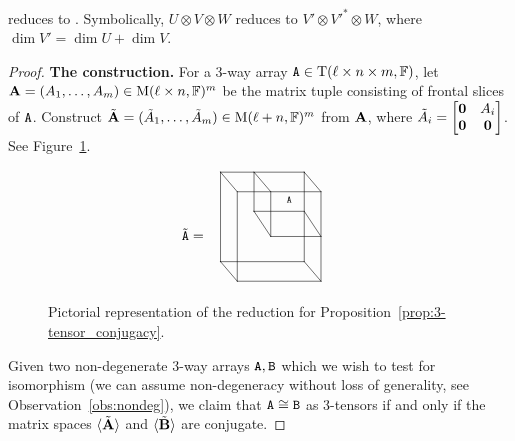 \documentclass[11pt]{article}
\begin{document}
\begin{proposition}\label{prop:3-tensor_conjugacy}
\ThreeTIlong reduces to \MatSpConjlong. Symbolically,  $U \otimes V \otimes W$  reduces to $V' \otimes V'^* \otimes W$, where $\dim V'  = \dim U + \dim V$. 
\end{proposition}
\begin{proof} 
\textbf{The construction.} 
For a 3-way array $\mathtt{A} \in \mathrm{T}(\ell\times n\times m, \mathbb{F})$, let $\mathbf{A}=(A_1, \dots, A_m)\in \mathrm{M}(\ell\times n, \mathbb{F})^m$ 
be the matrix tuple consisting of frontal slices of $\mathtt{A}$. Construct $\tilde {\mathbf{A}}=(\tilde A_1, \dots, \tilde A_m)\in \mathrm{M}(\ell+n, \mathbb{F})^m$ from $\mathbf{A}$, where $\tilde A_i=\begin{bmatrix}
\mathbf{0} & A_i \\
\mathbf{0} & \mathbf{0} 
\end{bmatrix}$. See Figure~\ref{fig:3-tensor_conjugacy}.


\begin{figure}[!htbp]
\[
\xymatrix@R=8pt@C=6pt{
& *{} \ar@{-}'[rrrrr]'[rrrrrdddd]'[dddd]'[] \ar@{-}'[rd]'[rdrrrrr]
&& *{} \ar@{-}'[dd]'[rrrdd]'[rrrddrd] \ar@{-}'[rd] \ar@{}'[rrrdd]|(0.7){\tA} %
&&& *{} \ar@{-}'[rd]'[rddddd]'[dddd] \\
& &*{} %
&& *{} \ar@{-}'[dd] &&&*{} \\%
& &&*{} \ar@{-}'[rd]'[rdrrr] &&&*{} %
&& \\
\tilde \tA = & &&&*{} %
&&& *{} %
\\
& *{} \ar@{-}'[rd]'[rdrrrrr] &&&&& *{} && \\ %
& &*{} \ar@{-}'[uuuu] &&&&&*{} &  %
}
\]
\caption{ \label{fig:3-tensor_conjugacy} Pictorial representation of the reduction for Proposition~\ref{prop:3-tensor_conjugacy}.}
\end{figure}

Given two non-degenerate 3-way arrays $\mathtt{A},\mathtt{B}$ which we wish to test for isomorphism (we can assume non-degeneracy without loss of generality, see Observation~\ref{obs:nondeg}), we claim that $\mathtt{A} \cong \mathtt{B}$ as 3-tensors if and only if the matrix spaces $\langle 
\tilde{\mathbf{A}}\rangle$ and $\langle\tilde{\mathbf{B}}\rangle$ are conjugate. 


\end{proof}
\end{document}
